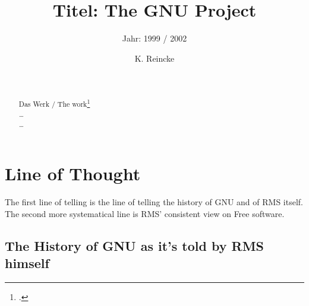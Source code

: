 \documentclass[DIV=calc,BCOR=5mm,11pt,headings=small,oneside,abstract=true, toc=bib]{scrartcl}
\begin{document}

\titlehead{Literaturexzerpt}
\subject{Autor(en): Stallman / Stallman1999a}
\title{Titel: The GNU Project}
\subtitle{Jahr: 1999 / 2002 }
\author{K. Reincke}

\maketitle

\begin{abstract}
\noindent
\cite[(in:)][]{StaGay2002a} \\
\noindent
\cite[(ist:)][]{Stallman1999a} \\
Das Werk / The work\footcite[][]{Stallman1999a} \\
\noindent \itshape
\ldots  
\\
\noindent
\ldots
\end{abstract}
\footnotesize
\normalsize

\section{Line of Thought}

The first line of telling is the line of telling the history of GNU and of RMS
itself. The second more systematical line is RMS’ consistent view on Free
software.

\subsection{The History of GNU as it’s told by RMS himself}
\end{document}
